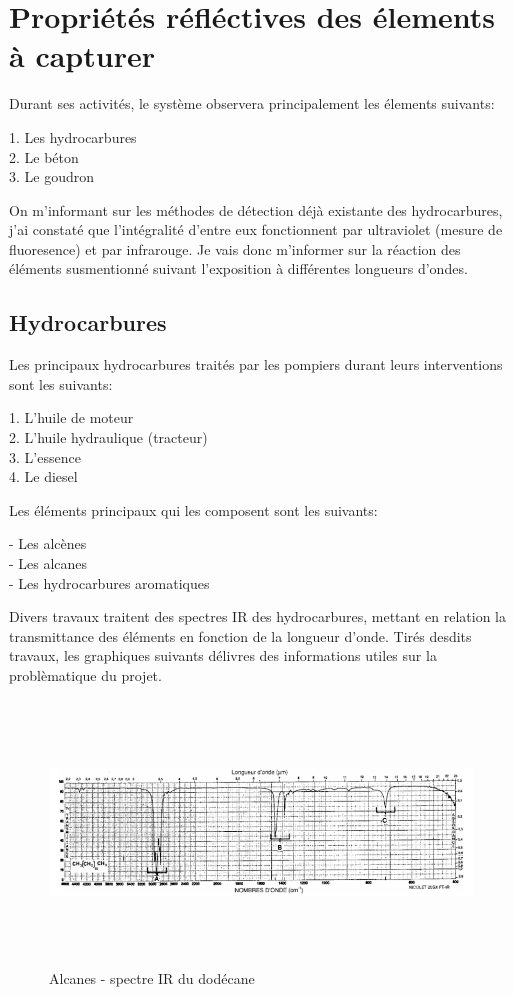 \section{Propriétés réfléctives des élements à capturer}
Durant ses activités, le système observera principalement les élements suivants:
\begin{listage}
    1. Les hydrocarbures\\
    2. Le béton\\
    3. Le goudron
\end{listage}
On m'informant sur les méthodes de détection déjà existante des hydrocarbures, j'ai constaté que l'intégralité d'entre eux fonctionnent
par ultraviolet (mesure de fluoresence) et par infrarouge. Je vais donc m'informer sur la réaction des éléments susmentionné suivant l'exposition à différentes longueurs d'ondes.
\subsection{Hydrocarbures}
Les principaux hydrocarbures traités par les pompiers durant leurs interventions sont les suivants:
\begin{listage}
    1. L'huile de moteur\\
    2. L'huile hydraulique (tracteur)\\
    3. L'essence \cite{TotalEnergies}\\
    4. Le diesel \cite{TotalEnergies}
\end{listage}
Les éléments principaux qui les composent sont les suivants:
\begin{listage}
    - Les alcènes\\
    - Les alcanes\\
    - Les hydrocarbures aromatiques
\end{listage}
Divers travaux \cite{Hydrocarbures} traitent des spectres IR des hydrocarbures, mettant en relation la transmittance des éléments en fonction de la longueur d'onde.
Tirés desdits travaux, les graphiques suivants délivres des informations utiles sur la problèmatique du projet.

\begin{figure}[H]
    \centering
    \includegraphics[height=7cm,angle=90]{assets/figures/alcanes1.png}
    \caption{Alcanes - spectre IR du dodécane \cite{Hydrocarbures}}
\end{figure}

